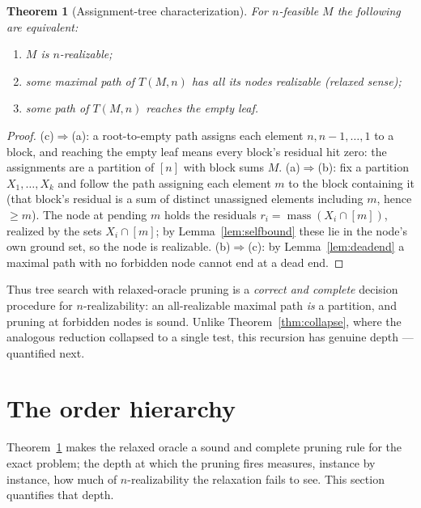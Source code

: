 \documentclass[11pt]{article}
\newtheorem{theorem}{Theorem}[section]
\theoremstyle{definition}
\theoremstyle{remark}
\newcommand{\mass}{\operatorname{mass}}
\newcommand{\intv}[1]{[#1]}
\begin{document}
\begin{theorem}[Assignment-tree characterization]\label{thm:tree}
For $n$-feasible $M$ the following are equivalent:
\begin{enumerate}[label=(\alph*),itemsep=1pt]
\item $M$ is $n$-realizable;
\item some maximal path of $T(M,n)$ has all its nodes realizable (relaxed sense);
\item some path of $T(M,n)$ reaches the empty leaf.
\end{enumerate}
\end{theorem}

\begin{proof}
(c)$\Rightarrow$(a): a root-to-empty path assigns each element $n,n-1,\dots,1$ to a
block, and reaching the empty leaf means every block's residual hit zero: the
assignments are a partition of $\intv n$ with block sums $M$.
(a)$\Rightarrow$(b): fix a partition $X_1,\dots,X_k$ and follow the path assigning
each element $m$ to the block containing it (that block's residual is a sum of
distinct unassigned elements including $m$, hence $\ge m$). The node at pending $m$
holds the residuals $r_i=\mass(X_i\cap\intv m)$, realized by the sets
$X_i\cap\intv m$; by Lemma~\ref{lem:selfbound} these lie in the node's own ground
set, so the node is realizable.
(b)$\Rightarrow$(c): by Lemma~\ref{lem:deadend} a maximal path with no forbidden
node cannot end at a dead end.
\end{proof}

Thus tree search with relaxed-oracle pruning is a \emph{correct and complete}
decision procedure for $n$-realizability: an all-realizable maximal path \emph{is} a
partition, and pruning at forbidden nodes is sound. Unlike
Theorem~\ref{thm:collapse}, where the analogous reduction collapsed to a single
test, this recursion has genuine depth --- quantified next.

\section{The order hierarchy}\label{sec:order}

Theorem~\ref{thm:tree} makes the relaxed oracle a sound and complete pruning
rule for the exact problem; the depth at which the pruning fires measures,
instance by instance, how much of $n$-realizability the relaxation fails to
see. This section quantifies that depth.
\end{document}
